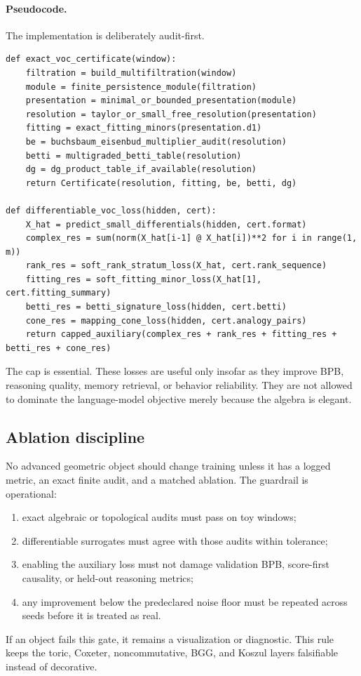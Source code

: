 \documentclass[11pt]{article}
\theoremstyle{definition}
\theoremstyle{plain}
\theoremstyle{remark}
\numberwithin{equation}{section}
\begin{document}
\paragraph{Pseudocode.}
The implementation is deliberately audit-first.
\begin{verbatim}
def exact_voc_certificate(window):
    filtration = build_multifiltration(window)
    module = finite_persistence_module(filtration)
    presentation = minimal_or_bounded_presentation(module)
    resolution = taylor_or_small_free_resolution(presentation)
    fitting = exact_fitting_minors(presentation.d1)
    be = buchsbaum_eisenbud_multiplier_audit(resolution)
    betti = multigraded_betti_table(resolution)
    dg = dg_product_table_if_available(resolution)
    return Certificate(resolution, fitting, be, betti, dg)

def differentiable_voc_loss(hidden, cert):
    X_hat = predict_small_differentials(hidden, cert.format)
    complex_res = sum(norm(X_hat[i-1] @ X_hat[i])**2 for i in range(1, m))
    rank_res = soft_rank_stratum_loss(X_hat, cert.rank_sequence)
    fitting_res = soft_fitting_minor_loss(X_hat[1], cert.fitting_summary)
    betti_res = betti_signature_loss(hidden, cert.betti)
    cone_res = mapping_cone_loss(hidden, cert.analogy_pairs)
    return capped_auxiliary(complex_res + rank_res + fitting_res + betti_res + cone_res)
\end{verbatim}
The cap is essential.  These losses are useful only insofar as they improve BPB, reasoning quality, memory retrieval, or behavior reliability.  They are not allowed to dominate the language-model objective merely because the algebra is elegant.


\subsection{Ablation discipline}\label{subsec:ablation-discipline}

No advanced geometric object should change training unless it has a logged metric, an exact finite audit, and a matched ablation.  The guardrail is operational:
\begin{enumerate}[leftmargin=2em]
  \item exact algebraic or topological audits must pass on toy windows;
  \item differentiable surrogates must agree with those audits within tolerance;
  \item enabling the auxiliary loss must not damage validation BPB, score-first causality, or held-out reasoning metrics;
  \item any improvement below the predeclared noise floor must be repeated across seeds before it is treated as real.
\end{enumerate}
If an object fails this gate, it remains a visualization or diagnostic.  This rule keeps the toric, Coxeter, noncommutative, BGG, and Koszul layers falsifiable instead of decorative.
\end{document}
